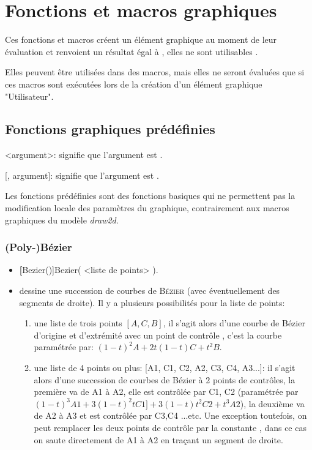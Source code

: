\chapter{Fonctions et macros graphiques}\label{cmdFoncGraph}


Ces fonctions et macros créent un élément graphique au moment de leur évaluation et renvoient un résultat égal à \Nil, elles ne sont utilisables .

Elles peuvent être utilisées dans des macros, mais elles ne seront évaluées que si ces macros sont exécutées lors de la création d'un élément graphique "Utilisateur".


\section{Fonctions graphiques prédéfinies}

<argument>: signifie que l'argument est .

[, argument]: signifie que l'argument est .

Les fonctions prédéfinies sont des fonctions basiques qui ne permettent pas la modification locale des paramètres du graphique, contrairement aux macros graphiques du modèle \textit{draw2d}.

\subsection{(Poly-)Bézier}\label{cmdBezier}
\begin{itemize}
 \item \util \textbf[Bezier()]{Bezier( <liste de points> )}.
 \item \desc dessine une succession de courbes de \textsc{Bézier} (avec éventuellement des segments de droite). Il y a plusieurs possibilités pour la liste de points:
  \begin{enumerate}
  \item une liste de trois points $[A,C,B]$, il s'agit alors d'une courbe de Bézier d'origine  et d'extrémité  avec un point de contrôle , c'est la courbe paramétrée par: $(1-t)^2A+2t(1-t)C+t^2B$.
  \item une liste de 4 points ou plus: [A1, C1, C2, A2, C3, C4, A3...]: il s'agit alors d'une succession de courbes de Bézier à 2 points de contrôles, la première va de A1 à A2, elle est contrôlée par C1, C2 (paramétrée par $(1-t)^3A1+3(1-t)^2tC1]+3(1-t)t^2C2+t^3A2$), la deuxième va de A2 à A3 et est contrôlée par C3,C4 ...etc. Une exception toutefois, on peut remplacer les deux points de contrôle par la constante \jump, dans ce cas on saute directement de A1 à A2 en traçant un segment de droite.
  \end{enumerate}
\end{itemize}

